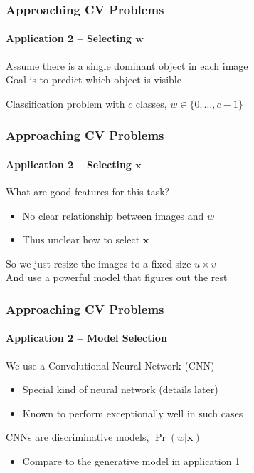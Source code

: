 \documentclass[xetex,professionalfont]{beamer}
\renewcommand{\vec}[1]{\ensuremath{\mathbf{#1}}}
\newcommand{\vw}{\vec{w}}
\newcommand{\vx}{\vec{x}}
\renewcommand\emph[1]{\textcolor{tuwcvl_inf_red}{#1}}
\begin{document}

\begin{frame}
\frametitle{Approaching CV Problems}
\framesubtitle{Application 2 -- Selecting $\vw$}

Assume there is a single dominant object in each image \\\medskip
Goal is to predict which object is visible

\bigskip
Classification problem with $c$ classes, $w\in\{0,\dots,c-1\}$

\end{frame}


\begin{frame}
\frametitle{Approaching CV Problems}
\framesubtitle{Application 2 -- Selecting $\vx$}

What are good features for this task?
\begin{itemize}
    \item No clear relationship between images and $w$
    \item Thus unclear how to select $\vx$
\end{itemize}

\bigskip
So we just resize the images to a fixed size $u\times v$ \\\medskip
And use a powerful model that figures out the rest

\end{frame}


\begin{frame}
\frametitle{Approaching CV Problems}
\framesubtitle{Application 2 -- Model Selection}

We use a \emph{Convolutional Neural Network} (\emph{CNN})
\begin{itemize}
    \item Special kind of neural network (details later)
    \item Known to perform exceptionally well in such cases
\end{itemize}

\bigskip
CNNs are \emph{discriminative models}, $\Pr(w|\vx)$  %
\begin{itemize}
    \item Compare to the generative model in application 1
\end{itemize}

\end{frame}
\end{document}
